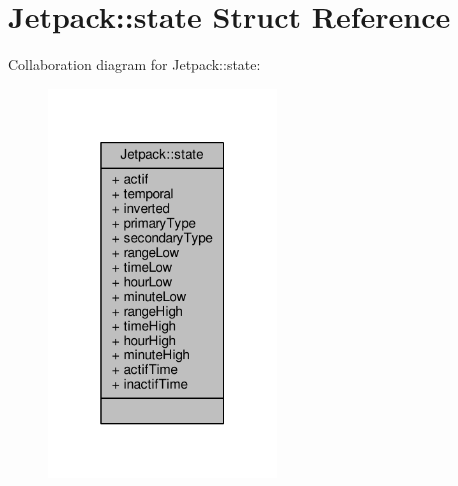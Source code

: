 \hypertarget{struct_jetpack_1_1state}{}\section{Jetpack\+:\+:state Struct Reference}
\label{struct_jetpack_1_1state}


Collaboration diagram for Jetpack\+:\+:state\+:\nopagebreak
\begin{figure}[H]
\begin{center}
\leavevmode
\includegraphics[width=172pt]{struct_jetpack_1_1state__coll__graph}
\end{center}
\end{figure}
